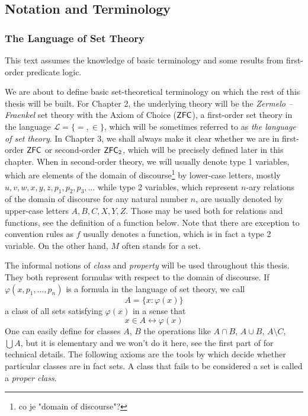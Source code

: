 \documentclass[12pt,a4paper]{article}
\renewcommand{\iff}{\leftrightarrow}
\begin{document}
\subsection{Notation and Terminology}
\subsubsection{The Language of Set Theory}
This text assumes the knowledge of basic terminology and some results from first-order predicate logic.

We are about to define basic set-theoretical terminology on which the rest of this thesis will be built. For Chapter 2, the underlying theory will be the \emph{Zermelo –Fraenkel} set theory with the Axiom of Choice ($\sf{ZFC}$), a first-order set theory in the language $\mathscr{L} = \{=, \in\}$, which will be sometimes referred to as \emph{the language of set theory}. In Chapter 3, we shall always make it clear whether we are in first-order $\sf{ZFC}$ or second-order $\sf{ZFC}_2$, which will be precisely defined later in this chapter. When in second-order theory, we will usually denote type 1 variables, which are elements of the domain of discourse\footnote{co je "domain of discourse"?} by lower-case letters, mostly $u, v, w, x, y, z, p_1, p_2, p_3,  \ldots$ while type 2 variables, which represent $n$-ary relations of the domain of discourse for any natural number $n$, are usually denoted by upper-case letters $A, B, C, X, Y, Z$. Those may be used both for relations and functions, see the definition of a function below. Note that there are exception to convention rules as $f$ usually denotes a function, which is in fact a type 2 variable. On the other hand, $M$ often stands for a set.


The informal notions of \emph{class} and \emph{property} will be used throughout this thesis. They both represent formulas with respect to the domain of discourse. If $\varphi(x, p_1, \ldots, p_n)$ is a formula in the language of set theory, we call 
\begin{equation}
A = \{x : \varphi(x)\}
\end{equation}
a class of all sets satisfying $\varphi(x)$ in a sense that 
\begin{equation}
x \in A \iff \varphi(x)
\end{equation}
One can easily define for classes $A$, $B$ the operations like $A \cap B$, $A \cup B$, $A \setminus C$, $\bigcup A$, but it is elementary and we won't do it here, see the first part of \cite{JechBook} for technical details. The following axioms are the tools by which decide whether particular classes are in fact sets. A class that fails to be considered a set is called a \emph{proper class}.
\end{document}
